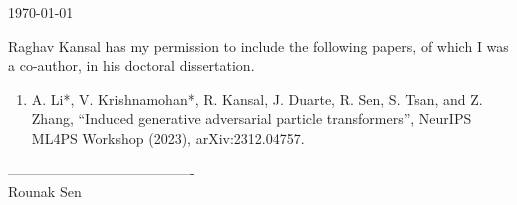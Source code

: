 \documentclass{article}
\begin{document}
\today

Raghav Kansal has my permission to include the following papers, of which
I was a co-author, in his doctoral dissertation.

\begin{enumerate}
    \item A. Li*, V. Krishnamohan*, R. Kansal, J. Duarte, R. Sen, S. Tsan, and Z. Zhang, “Induced generative adversarial particle transformers”, NeurIPS ML4PS Workshop (2023), arXiv:2312.04757.
\end{enumerate}

\baselineskip
----------------------------------------\\
Rounak Sen
\end{document}
